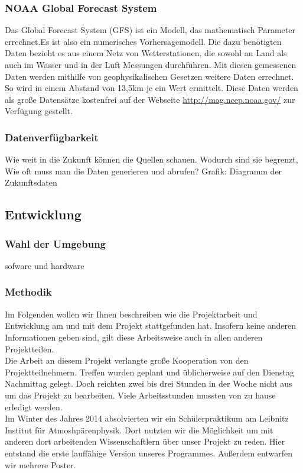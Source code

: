 \documentclass[a4paper,oneside,12pt,titlepage]{article}
\newcommand{\link}[1]{\textcolor{link}{\url{#1}}}	%
\begin{document}
\subsubsection*{NOAA Global Forecast System} %
Das Global Forecast System (GFS)  ist ein Modell, das mathematisch Parameter errechnet.Es ist also ein numerisches Vorhersagemodell. Die dazu benötigten Daten bezieht es aus einem Netz von Wetterstationen, die sowohl an Land als auch im Wasser und in der Luft Messungen durchführen. Mit diesen gemessenen Daten werden mithilfe von geophysikalischen Gesetzen weitere Daten errechnet. So wird in einem Abstand von 13,5km je ein Wert ermittelt. Diese Daten werden als große Datensätze kostenfrei auf der Webseite \link{http://mag.ncep.noaa.gov/} \cite{ncep}  zur Verfügung gestellt.

\subsubsection{Datenverfügbarkeit} %
Wie weit in die Zukunft können die Quellen schauen. Wodurch sind sie begrenzt, Wie oft muss man die Daten generieren und abrufen?
Grafik: Diagramm der Zukunftsdaten

\subsection{Entwicklung} %

\subsubsection{Wahl der Umgebung}\label{sec:ent} %
sofware und hardware

\subsubsection{Methodik} %
Im Folgenden wollen wir Ihnen beschreiben wie die Projektarbeit und Entwicklung am  und mit dem Projekt stattgefunden hat. 
Insofern keine anderen Informationen geben sind, gilt diese Arbeitsweise auch in allen anderen Projektteilen. \\
Die Arbeit an diesem Projekt verlangte große Kooperation von den Projektteilnehmern. Treffen wurden geplant und üblicherweise auf den Dienstag Nachmittag gelegt. Doch reichten zwei bis drei Stunden in der Woche nicht aus um das Projekt zu bearbeiten. Viele Arbeitsstunden mussten von zu hause erledigt werden.\\
Im Winter des Jahres 2014 absolvierten wir ein Schülerpraktikum am Leibnitz Institut für Atmoshpärenphysik. %
Dort nutzten wir die Möglichkeit um mit anderen dort arbeitenden Wissenschaftlern über unser Projekt zu reden. Hier entstand die erste lauffähige Version unseres Programmes. Außerdem entwarfen wir mehrere Poster.
\end{document}
